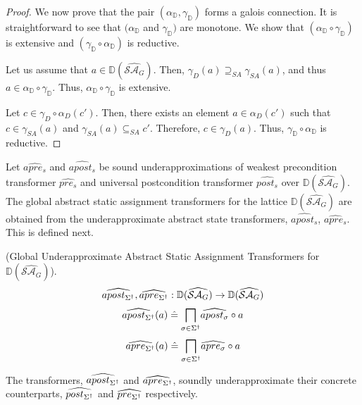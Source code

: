 \begin{proof} 
  We now prove that the pair $(\alpha_{\mathbb{D}},\gamma_{\mathbb{D}})$ forms a galois connection. 
  It is straightforward to see that $(\alpha_{\mathbb{D}}$ and $\gamma_{\mathbb{D}})$ are monotone. 
  We show that $(\alpha_{\mathbb{D}} \circ \gamma_{\mathbb{D}})$ is extensive and 
  $(\gamma_{\mathbb{D}} \circ \alpha_{\mathbb{D}})$ is reductive. 
 
  Let us assume that $a \in \mathbb{D}(\widehat{\mathcal{SA}_G})$.  Then, 
  $\gamma_D(a) \supseteq_{SA} \gamma_{SA}(a)$, and thus 
  $a \in \alpha_{\mathbb{D}} \circ \gamma_{\mathbb{D}}$.  Thus,  
  $\alpha_{\mathbb{D}} \circ \gamma_{\mathbb{D}}$ is extensive. 
  
  
  Let $c \in \gamma_D \circ \alpha_D(c')$. Then, there exists an element $a \in \alpha_D(c')$ 
  such that $c \in \gamma_{SA}(a)$ and $\gamma_{SA}(a) \subseteq_{SA} c'$. Therefore, 
  $c \in \gamma_D(a)$.  Thus, $\gamma_{\mathbb{D}} \circ \alpha_{\mathbb{D}}$ is reductive. 
\end{proof}
%
Let $\widehat{apre_s}$ and $\widehat{apost_s}$ be sound underapproximations of
weakest precondition transformer $\widehat{pre_s}$ and universal postcondition 
transformer $\widehat{post_s}$ over $\mathbb{D}(\widehat{\mathcal{SA}_{G}})$. 
%
The global abstract static assignment transformers for the 
lattice $\mathbb{D}(\widehat{\mathcal{SA}_G})$ are obtained 
from the underapproximate 
abstract state transformers, $\widehat{apost_s}$, $\widehat{apre_s}$. 
This is defined next.
%
\begin{definition} (Global Underapproximate Abstract Static Assignment
  Transformers for $\mathbb{D}(\widehat{\mathcal{SA}_G})$). 
  \[ 
     \widehat{apost_{\Sigma^\dagger}}, \widehat{apre_{\Sigma^\dagger}} : 
     \mathbb{D}(\widehat{\mathcal{SA}_G}) \rightarrow
     \mathbb{D}(\widehat{\mathcal{SA}_{G}}) 
   \]
   \[
     \widehat{apost_{\Sigma^\dagger}}(a) \mathrel{\hat=} 
     \underset{\sigma \in \Sigma^\dagger}{\bigsqcap} \widehat{apost_{\sigma}} \circ a 
   \]
  \[
    \widehat{apre_{\Sigma^\dagger}}(a) \mathrel{\hat=} 
    \underset{\sigma \in \Sigma^\dagger}{\bigsqcap} \widehat{apre_{\sigma}} \circ a 
   \]
\end{definition}
%
The transformers, $\widehat{apost_{\Sigma^\dagger}}$ and
$\widehat{apre_{\Sigma^\dagger}}$, soundly underapproximate 
their concrete counterparts, $\widehat{post_{\Sigma^\dagger}}$ 
and $\widehat{pre_{\Sigma^\dagger}}$ respectively. 
%


